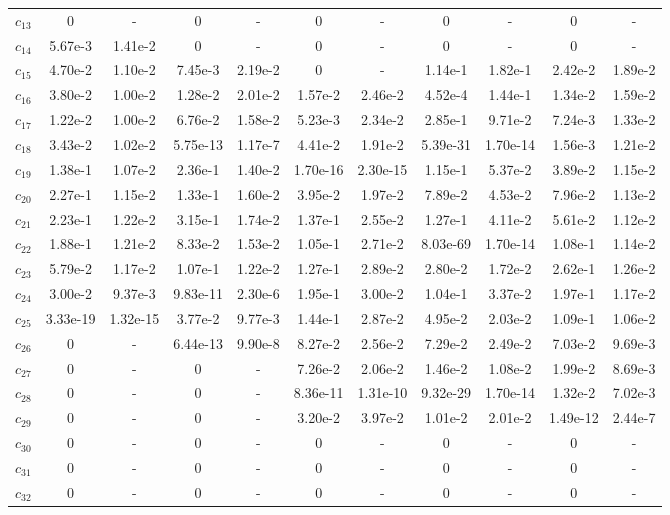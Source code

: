 \begin{table}[p]
{\begin{tabular}{lcc@{\hspace{16pt}}cc@{\hspace{16pt}}cc@{\hspace{16pt}}cc@{\hspace{16pt}}cc}
$c_{13}$ & 0 & - & 0 & - & 0 & - & 0 & - & 0 & - \\
$c_{14}$ & 5.67e-3 & 1.41e-2 & 0 & - & 0 & - & 0 & - & 0 & - \\
$c_{15}$ & 4.70e-2 & 1.10e-2 & 7.45e-3 & 2.19e-2 & 0 & - & 1.14e-1 & 1.82e-1 & 2.42e-2 & 1.89e-2 \\
$c_{16}$ & 3.80e-2 & 1.00e-2 & 1.28e-2 & 2.01e-2 & 1.57e-2 & 2.46e-2 & 4.52e-4 & 1.44e-1 & 1.34e-2 & 1.59e-2 \\
$c_{17}$ & 1.22e-2 & 1.00e-2 & 6.76e-2 & 1.58e-2 & 5.23e-3 & 2.34e-2 & 2.85e-1 & 9.71e-2 & 7.24e-3 & 1.33e-2 \\
$c_{18}$ & 3.43e-2 & 1.02e-2 & 5.75e-13 & 1.17e-7 & 4.41e-2 & 1.91e-2 & 5.39e-31 & 1.70e-14 & 1.56e-3 & 1.21e-2 \\
$c_{19}$ & 1.38e-1 & 1.07e-2 & 2.36e-1 & 1.40e-2 & 1.70e-16 & 2.30e-15 & 1.15e-1 & 5.37e-2 & 3.89e-2 & 1.15e-2 \\
$c_{20}$ & 2.27e-1 & 1.15e-2 & 1.33e-1 & 1.60e-2 & 3.95e-2 & 1.97e-2 & 7.89e-2 & 4.53e-2 & 7.96e-2 & 1.13e-2 \\
$c_{21}$ & 2.23e-1 & 1.22e-2 & 3.15e-1 & 1.74e-2 & 1.37e-1 & 2.55e-2 & 1.27e-1 & 4.11e-2 & 5.61e-2 & 1.12e-2 \\
$c_{22}$ & 1.88e-1 & 1.21e-2 & 8.33e-2 & 1.53e-2 & 1.05e-1 & 2.71e-2 & 8.03e-69 & 1.70e-14 & 1.08e-1 & 1.14e-2 \\
$c_{23}$ & 5.79e-2 & 1.17e-2 & 1.07e-1 & 1.22e-2 & 1.27e-1 & 2.89e-2 & 2.80e-2 & 1.72e-2 & 2.62e-1 & 1.26e-2 \\
$c_{24}$ & 3.00e-2 & 9.37e-3 & 9.83e-11 & 2.30e-6 & 1.95e-1 & 3.00e-2 & 1.04e-1 & 3.37e-2 & 1.97e-1 & 1.17e-2 \\
$c_{25}$ & 3.33e-19 & 1.32e-15 & 3.77e-2 & 9.77e-3 & 1.44e-1 & 2.87e-2 & 4.95e-2 & 2.03e-2 & 1.09e-1 & 1.06e-2 \\
$c_{26}$ & 0 & - & 6.44e-13 & 9.90e-8 & 8.27e-2 & 2.56e-2 & 7.29e-2 & 2.49e-2 & 7.03e-2 & 9.69e-3 \\
$c_{27}$ & 0 & - & 0 & - & 7.26e-2 & 2.06e-2 & 1.46e-2 & 1.08e-2 & 1.99e-2 & 8.69e-3 \\
$c_{28}$ & 0 & - & 0 & - & 8.36e-11 & 1.31e-10 & 9.32e-29 & 1.70e-14 & 1.32e-2 & 7.02e-3 \\
$c_{29}$ & 0 & - & 0 & - & 3.20e-2 & 3.97e-2 & 1.01e-2 & 2.01e-2 & 1.49e-12 & 2.44e-7 \\
$c_{30}$ & 0 & - & 0 & - & 0 & - & 0 & - & 0 & - \\
$c_{31}$ & 0 & - & 0 & - & 0 & - & 0 & - & 0 & - \\
$c_{32}$ & 0 & - & 0 & - & 0 & - & 0 & - & 0 & - \\
\bottomrule
\end{tabular}}
\endgroup
\end{table}
\clearpage
